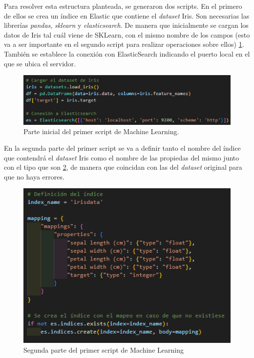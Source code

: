 Para resolver esta estructura planteada, se generaron dos scripts. En el primero de ellos se crea un índice en Elastic que contiene el \textit{dataset} Iris. Son necesarias las librerías \textit{pandas}, \textit{sklearn} y \textit{elasticsearch}. De manera que inicialmente se cargan los datos de Iris tal cuál viene de SKLearn, con el mismo nombre de los campos (esto va a ser importante en el segundo script para realizar operaciones sobre ellos) \ref{fig:script11}. También se establece la conexión con ElasticSearch indicando el puerto local en el que se ubica el servidor.

\begin{figure}
    \centering
    \includegraphics[width=1\linewidth]{img/iris1.png}
    \caption{Parte inicial del primer script de Machine Learning.}
    \label{fig:script11}
\end{figure}

En la segunda parte del primer script se va a definir tanto el nombre del índice que contendrá el \textit{dataset} Iris como el nombre de las propiedas del mismo junto con el tipo que son \ref{fig:script12}, de manera que coincidan con las del \textit{dataset} original para que no haya errores. 

\begin{figure}
    \centering
    \includegraphics[width=1\linewidth]{img/iris2.png}
    \caption{Segunda parte del primer script de Machine Learning}
    \label{fig:script12}
\end{figure}

